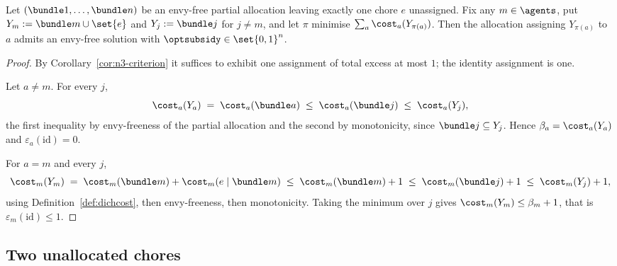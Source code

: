 \begin{theorem}
\label{thm:n3-one}
Let $(\bundle1,\dots,\bundle n)$ be an envy-free partial allocation leaving
exactly one chore $e$ unassigned. Fix any $m \in \agents$, put
$Y_m := \bundle m \cup \set{e}$ and $Y_j := \bundle j$ for $j \ne m$, and let
$\pi$ minimise $\sum_a \cost_a(Y_{\pi(a)})$. Then the allocation assigning
$Y_{\pi(a)}$ to $a$ admits an envy-free solution with
$\optsubsidy \in \set{0,1}^n$.
\end{theorem}

\begin{proof}
By Corollary~\ref{cor:n3-criterion} it suffices to exhibit one assignment of
total excess at most $1$; the identity assignment is one.

Let $a \ne m$. For every $j$,
\[
  \cost_a(Y_a) \;=\; \cost_a(\bundle a) \;\le\; \cost_a(\bundle j)
  \;\le\; \cost_a(Y_j),
\]
the first inequality by envy-freeness of the partial allocation and the second
by monotonicity, since $\bundle j \subseteq Y_j$. Hence $\beta_a =
\cost_a(Y_a)$ and $\varepsilon_a(\mathrm{id}) = 0$.

For $a = m$ and every $j$,
\[
  \cost_m(Y_m) \;=\; \cost_m(\bundle m) + \cost_m(e \mid \bundle m)
  \;\le\; \cost_m(\bundle m) + 1
  \;\le\; \cost_m(\bundle j) + 1
  \;\le\; \cost_m(Y_j) + 1,
\]
using Definition~\ref{def:dichcost}, then envy-freeness, then monotonicity.
Taking the minimum over $j$ gives $\cost_m(Y_m) \le \beta_m + 1$, that is
$\varepsilon_m(\mathrm{id}) \le 1$.
\end{proof}

\subsection{Two unallocated chores}
\label{sec:n3-two}


